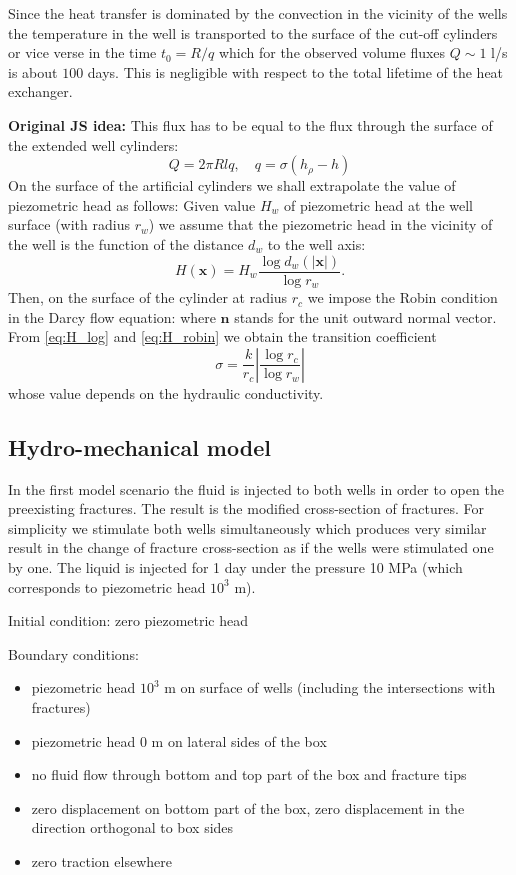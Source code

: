 \documentclass{article}
\newcommand{\eq}[1]{\begin{equation}#1\end{equation}}
\newcommand{\nn}{\vc n}
\newcommand{\vc}[1]{\boldsymbol{#1}}
\newcommand{\xx}{\vc x}
\begin{document}
Since the heat transfer is dominated by the convection in the vicinity of the wells the temperature in the well is transported to the surface of the cut-off cylinders or vice verse in the time $t_0 = R/q$ which for the observed volume fluxes $Q\sim 1$ l/s is about $100$ days. This is negligible with respect to the total lifetime of the heat exchanger.


{\bf Original JS idea:}
This flux has to be equal to the flux through the surface of the extended well cylinders:
\[
    Q = 2\pi R l q,\quad q=\sigma(h_\rho - h)
\]
On the surface of the artificial cylinders we shall extrapolate the value of piezometric head as follows: Given value $H_w$ of piezometric head at the well surface (with radius $r_w$) we assume that the piezometric head in the vicinity of the well is the function of the distance $d_w$ to the well axis:
\eq{\label{eq:H_log} H(\xx) = H_w\frac{\log d_w(|\xx|)}{\log r_w}. }
Then, on the surface of the cylinder at radius $r_c$ we impose the Robin condition in the Darcy flow equation:
where $\nn$ stands for the unit outward normal vector.
From \eqref{eq:H_log} and \eqref{eq:H_robin} we obtain the transition coefficient
\[ \sigma = \frac{k}{r_c}\left|\frac{\log r_c}{\log r_w}\right| \]
whose value depends on the hydraulic conductivity.


\subsection{Hydro-mechanical model}
\label{sc:hm_model}

In the first model scenario the fluid is injected to both wells in order to open the preexisting fractures.
The result is the modified cross-section of fractures.
For simplicity we stimulate both wells simultaneously which produces very similar result in the change of fracture cross-section as if the wells were stimulated one by one.
The liquid is injected for 1 day under the pressure 10 MPa (which corresponds to piezometric head $10^3$ m).

Initial condition: zero piezometric head

Boundary conditions:
\begin{itemize}
\item piezometric head $10^3$ m on surface of wells (including the intersections with fractures)
\item piezometric head 0 m on lateral sides of the box
\item no fluid flow through bottom and top part of the box and fracture tips
\item zero displacement on bottom part of the box, zero displacement in the direction orthogonal to box sides
\item zero traction elsewhere
\end{itemize}
\end{document}
